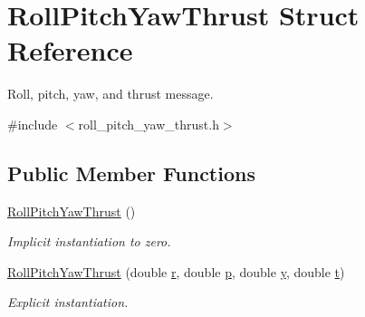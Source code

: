 \hypertarget{structRollPitchYawThrust}{\section{Roll\-Pitch\-Yaw\-Thrust Struct Reference}
\label{structRollPitchYawThrust}
}


Roll, pitch, yaw, and thrust message.  




{\ttfamily \#include $<$roll\-\_\-pitch\-\_\-yaw\-\_\-thrust.\-h$>$}

\subsection*{Public Member Functions}
\begin{DoxyCompactItemize}
\item 
\hyperlink{structRollPitchYawThrust_ade35aec07cbe2f4639cbbe1b38e39c04}{Roll\-Pitch\-Yaw\-Thrust} ()
\begin{DoxyCompactList}\small\item\em Implicit instantiation to zero. \end{DoxyCompactList}\item 
\hyperlink{structRollPitchYawThrust_a910222ed6c81f1d4cf7b030fc3367e4e}{Roll\-Pitch\-Yaw\-Thrust} (double \hyperlink{structRollPitchYawThrust_a473205dda8a9c3cd39c7f20b9bf2573b}{r}, double \hyperlink{structRollPitchYawThrust_a5a48538eafec9fcfdfb5c3ff714a6044}{p}, double \hyperlink{structRollPitchYawThrust_a0c2bb32fd791f081b55ffd971dcf1206}{y}, double \hyperlink{structRollPitchYawThrust_aa489ea694a9abb4b891e371d31e63ec4}{t})
\begin{DoxyCompactList}\small\item\em Explicit instantiation. \end{DoxyCompactList}\end{DoxyCompactItemize}
